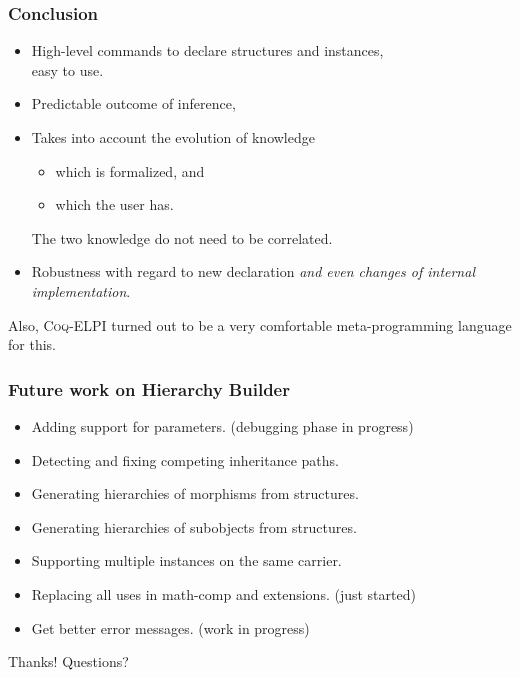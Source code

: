\documentclass[11pt]{beamer}
\begin{document}
\begin{frame}
  \frametitle{Conclusion}

  \begin{itemize}
  \item High-level commands to declare structures and instances, \\
    easy to use.
    \vfill
  \item Predictable outcome of inference,
    \vfill
  \item Takes into account the evolution of knowledge
    \begin{itemize}
    \item which is formalized, and
    \item which the user has.
    \end{itemize}
    The two knowledge do not need to be correlated.
    \vfill
  \item Robustness with regard to new declaration \emph{and even changes of
    internal implementation}.
  \end{itemize}

  \vfill\pause
  Also, \textsc{Coq-ELPI} turned out to be a very comfortable
  meta-programming language for this.

\end{frame}

\begin{frame}
  \frametitle{Future work on Hierarchy Builder}
  \begin{itemize}
  \item Adding support for parameters. (debugging phase in progress)
    \vfill
  \item Detecting and fixing competing inheritance paths.
    \vfill
  \item Generating hierarchies of morphisms from structures.
    \vfill
  \item Generating hierarchies of subobjects from structures.
    \vfill
  \item Supporting multiple instances on the same carrier.
    \vfill
  \item Replacing all uses in math-comp and extensions. (just started)
    \vfill
  \item Get better error messages. (work in progress)
  \end{itemize}
\end{frame}

\begin{frame}
  \begin{center}
   {\huge Thanks! Questions?}
  \end{center}
\end{frame}
\end{document}
